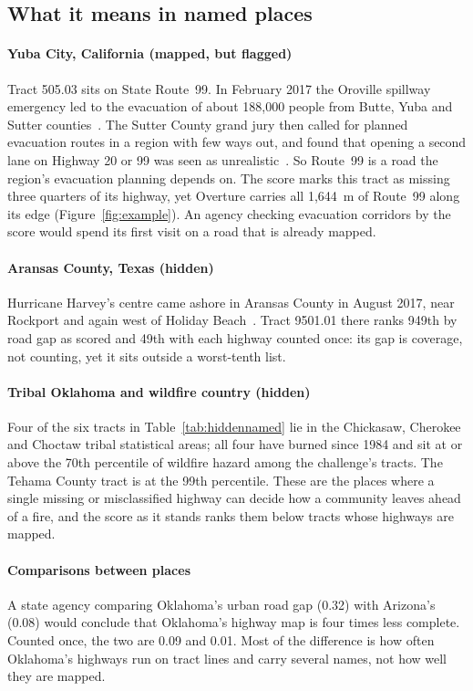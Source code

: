 \documentclass[10pt,twocolumn,a4paper]{article}
\begin{document}
\subsection{What it means in named places}
\label{sec:named}
\paragraph{Yuba City, California (mapped, but flagged)} Tract 505.03 sits on State Route~99. In February 2017 the
Oroville spillway emergency led to the evacuation of about 188,000 people from Butte, Yuba and Sutter
counties~\cite{caloes}. The Sutter County grand jury then called for planned evacuation routes in a region with few ways
out, and found that opening a second lane on Highway 20 or 99 was seen as unrealistic~\cite{grandjury}. So Route~99 is a
road the region's evacuation planning depends on. The score marks this tract as missing three quarters of its highway,
yet Overture carries all 1,644~m of Route~99 along its edge (Figure~\ref{fig:example}). An agency checking evacuation
corridors by the score would spend its first visit on a road that is already mapped.

\paragraph{Aransas County, Texas (hidden)} Hurricane Harvey's centre came ashore in Aransas County in August 2017, near
Rockport and again west of Holiday Beach~\cite{harvey}. Tract 9501.01 there ranks 949th by road gap as scored and 49th
with each highway counted once: its gap is coverage, not counting, yet it sits outside a worst-tenth list.

\paragraph{Tribal Oklahoma and wildfire country (hidden)} Four of the six tracts in Table~\ref{tab:hiddennamed} lie in the
Chickasaw, Cherokee and Choctaw tribal statistical areas; all four have burned since 1984 and sit at or above the 70th
percentile of wildfire hazard among the challenge's tracts. The Tehama County tract is at the 99th percentile. These are
the places where a single missing or misclassified highway can decide how a community leaves ahead of a fire, and the
score as it stands ranks them below tracts whose highways are mapped.

\paragraph{Comparisons between places} A state agency comparing Oklahoma's urban road gap (0.32) with Arizona's (0.08)
would conclude that Oklahoma's highway map is four times less complete. Counted once, the two are 0.09 and 0.01. Most of
the difference is how often Oklahoma's highways run on tract lines and carry several names, not how well they are mapped.
\end{document}
